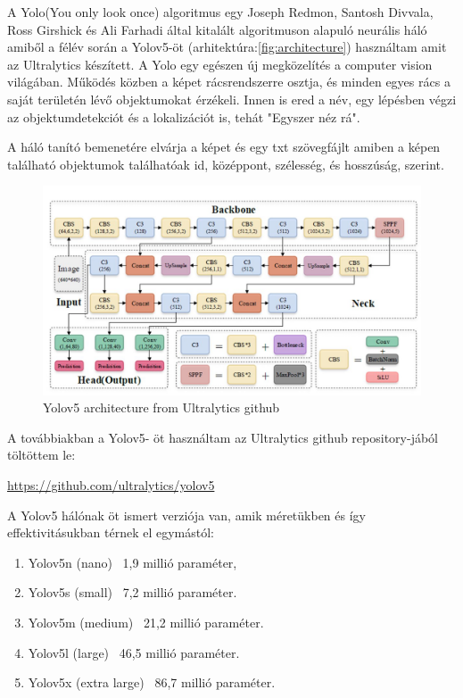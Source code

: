 \documentclass{article}
\begin{document}
A Yolo(You only look once) algoritmus egy Joseph Redmon, Santosh Divvala, Ross Girshick és Ali Farhadi által kitalált algoritmuson alapuló neurális háló amiből a félév során a Yolov5-öt (arhitektúra:\autoref{fig:architecture}) használtam amit az Ultralytics készített. A Yolo egy egészen új megközelítés a computer vision világában. Működés közben a képet rácsrendszerre osztja, és minden egyes rács a saját területén lévő objektumokat érzékeli. Innen is ered a név, egy lépésben végzi az objektumdetekciót és a lokalizációt is, tehát "Egyszer néz rá".
\par A háló tanító bemenetére elvárja a képet és egy txt szövegfájlt amiben a képen található objektumok találhatóak id, középpont, szélesség, és hosszúság, szerint.

\begin{figure}[ht]
    \centering
    \includegraphics[width=1
    \linewidth]{architecture.png}
    \caption{\label{fig:architecture}Yolov5 architecture from Ultralytics github}
\end{figure}
\vspace{3mm}\par
\noindent A továbbiakban a Yolov5- öt használtam az Ultralytics github repository-jából töltöttem le: 
\vspace{1mm}\par
\noindent \href{https://github.com/ultralytics/yolov5}{https://github.com/ultralytics/yolov5}
\vspace{2mm}\par
\noindent A Yolov5 \cite{yolov5github} hálónak öt ismert verziója van, amik méretükben és így effektivitásukban térnek el egymástól:
\vspace{2mm}\par
\begin{enumerate}
\item Yolov5n (nano) ~1,9 millió paraméter,
\item Yolov5s (small) ~7,2 millió paraméter.
\item Yolov5m (medium) ~21,2 millió paraméter.
\item Yolov5l (large) ~46,5 millió paraméter.
\item Yolov5x (extra large) ~86,7 millió paraméter. \noindent\par
\end{enumerate}
\end{document}
